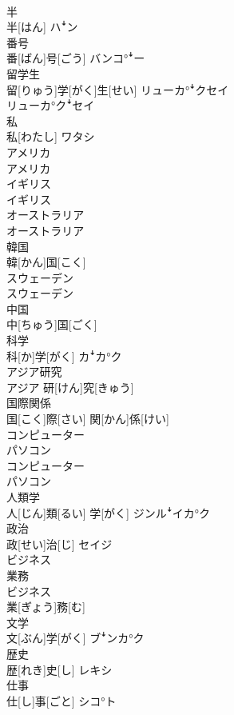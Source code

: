 \documentclass[8pt]{extreport}
\begin{document}
\begin{CJK}{UTF8}{min}
\\	半	
\\	半[はん]	ハꜜン
\\	番号	
\\	番[ばん]号[ごう]	バンコ°ꜜー
\\	留学生	
\\	留[りゅう]学[がく]生[せい]	リューカ°ꜜクセイ 
\\	リューカ°クꜜセイ
\\	私	
\\	私[わたし]	ワタシ
\\	アメリカ	
\\	アメリカ	
\\	イギリス	
\\	イギリス	
\\	オーストラリア	
\\	オーストラリア	
\\	韓国	
\\	韓[かん]国[こく]	
\\	スウェーデン	
\\	スウェーデン	
\\	中国	
\\	中[ちゅう]国[ごく]	
\\	科学	
\\	科[か]学[がく]	カꜜカ°ク
\\	アジア研究	
\\	アジア 研[けん]究[きゅう]	
\\	国際関係	
\\	国[こく]際[さい] 関[かん]係[けい]	
\\	コンピューター 
\\	パソコン	
\\	コンピューター 
\\	パソコン	
\\	人類学	
\\	人[じん]類[るい] 学[がく]	ジンルꜜイカ°ク
\\	政治	
\\	政[せい]治[じ]	セイジ
\\	ビジネス 
\\	業務	
\\	ビジネス 
\\	業[ぎょう]務[む]	
\\	文学	
\\	文[ぶん]学[がく]	ブꜜンカ°ク
\\	歴史	
\\	歴[れき]史[し]	レキシ
\\	仕事	
\\	仕[し]事[ごと]	シコ°ト

\end{CJK}
\end{document}
